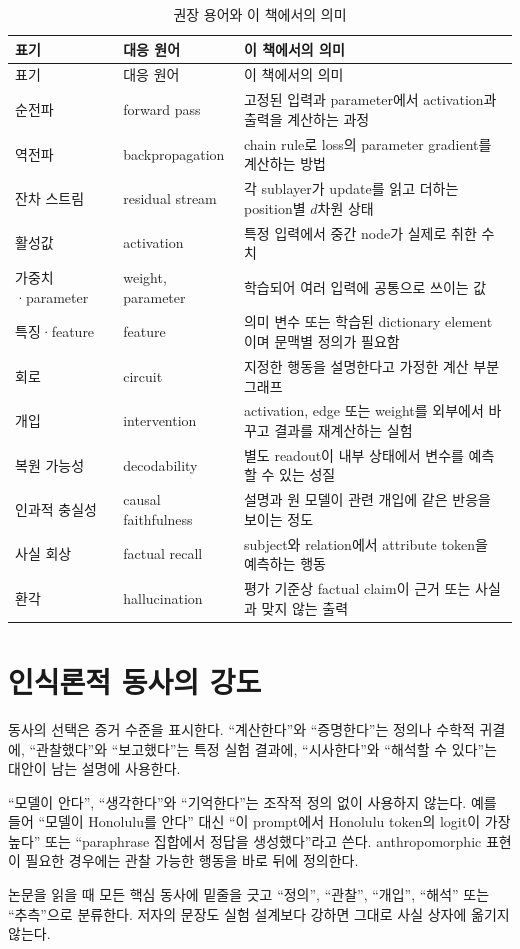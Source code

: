 \begin{longtable}{@{}p{}p{}p{}@{}}
\caption{권장 용어와 이 책에서의 의미}\label{tab:glossary}\\
\toprule
표기 & 대응 원어 & 이 책에서의 의미 \\
\midrule
\endfirsthead
\toprule
표기 & 대응 원어 & 이 책에서의 의미 \\
\midrule
\endhead
순전파 & forward pass & 고정된 입력과 parameter에서 activation과 출력을 계산하는 과정 \\
역전파 & backpropagation & chain rule로 loss의 parameter gradient를 계산하는 방법 \\
잔차 스트림 & residual stream & 각 sublayer가 update를 읽고 더하는 position별 $d$차원 상태 \\
활성값 & activation & 특정 입력에서 중간 node가 실제로 취한 수치 \\
가중치·parameter & weight, parameter & 학습되어 여러 입력에 공통으로 쓰이는 값 \\
특징·feature & feature & 의미 변수 또는 학습된 dictionary element이며 문맥별 정의가 필요함 \\
회로 & circuit & 지정한 행동을 설명한다고 가정한 계산 부분그래프 \\
개입 & intervention & activation, edge 또는 weight를 외부에서 바꾸고 결과를 재계산하는 실험 \\
복원 가능성 & decodability & 별도 readout이 내부 상태에서 변수를 예측할 수 있는 성질 \\
인과적 충실성 & causal faithfulness & 설명과 원 모델이 관련 개입에 같은 반응을 보이는 정도 \\
사실 회상 & factual recall & subject와 relation에서 attribute token을 예측하는 행동 \\
환각 & hallucination & 평가 기준상 factual claim이 근거 또는 사실과 맞지 않는 출력 \\
\bottomrule
\end{longtable}

\section{인식론적 동사의 강도}

동사의 선택은 증거 수준을 표시한다.
``계산한다''와 ``증명한다''는 정의나 수학적 귀결에, ``관찰했다''와 ``보고했다''는 특정 실험 결과에, ``시사한다''와 ``해석할 수 있다''는 대안이 남는 설명에 사용한다.

``모델이 안다'', ``생각한다''와 ``기억한다''는 조작적 정의 없이 사용하지 않는다.
예를 들어 ``모델이 Honolulu를 안다'' 대신 ``이 prompt에서 Honolulu token의 logit이 가장 높다'' 또는 ``paraphrase 집합에서 정답을 생성했다''라고 쓴다.
anthropomorphic 표현이 필요한 경우에는 관찰 가능한 행동을 바로 뒤에 정의한다.

\begin{studybox}
논문을 읽을 때 모든 핵심 동사에 밑줄을 긋고 ``정의'', ``관찰'', ``개입'', ``해석'' 또는 ``추측''으로 분류한다.
저자의 문장도 실험 설계보다 강하면 그대로 사실 상자에 옮기지 않는다.
\end{studybox}
